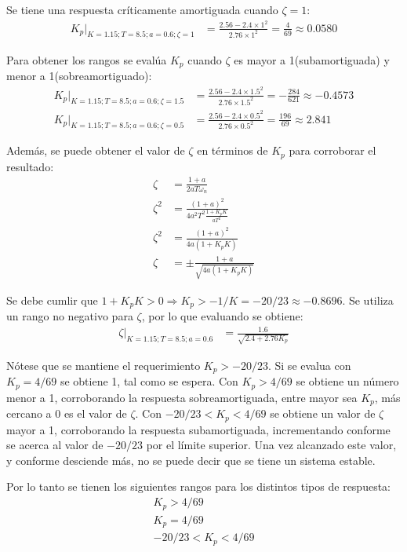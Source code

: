 \begin{ejercicio}
  Se tiene una respuesta críticamente amortiguada cuando $\zeta = 1$:
  \begin{align*}
    K_p|_{K=1.15; T=8.5; a=0.6; \zeta=1} &= \frac{2.56 - 2.4 \times 1^2 }{2.76 \times 1^2 } = \frac{4}{69} \approx 0.0580
  \end{align*}

  Para obtener los rangos se evalúa $K_p$ cuando $\zeta$ es mayor a 1(subamortiguada) y menor a 1(sobreamortiguado):
  \begin{align*}
    K_p|_{K=1.15; T=8.5; a=0.6; \zeta=1.5} &= \frac{2.56 - 2.4 \times 1.5^2 }{2.76 \times 1.5^2 } = -\frac{284}{621} \approx -0.4573
    \\
    K_p|_{K=1.15; T=8.5; a=0.6; \zeta=0.5} &= \frac{2.56 - 2.4 \times 0.5^2 }{2.76 \times 0.5^2 } = \frac{196}{69} \approx 2.841
  \end{align*}

  Además, se puede obtener el valor de $\zeta$ en términos de $K_p$ para corroborar el resultado:
  \begin{align*}
    \zeta &= \frac{1+a}{2aT\omega_n}
    \\
    \zeta^2 &= \frac{(1+a)^2}{4 a^2 T^2 \frac{1 + K_p K}{aT^2}}
    \\
    \zeta^2 &= \frac{(1+a)^2}{4 a (1 + K_p K)}
    \\
    \zeta &= \pm\frac{1+a}{\sqrt{4 a (1 + K_p K)}}
  \end{align*}

  Se debe cumlir que $1+K_p K > 0 \Rightarrow K_p > -1/K = -20/23 \approx -0.8696$.
  Se utiliza un rango no negativo para $\zeta$, por lo que evaluando se obtiene:
    \begin{align*}
    \zeta|_{K=1.15; T=8.5; a=0.6} &= \frac{1.6}{\sqrt{2.4 + 2.76 K_p}}
  \end{align*}

  Nótese que se mantiene el requerimiento $K_p > -20/23$. Si se evalua con $K_p = 4/69$ se obtiene 1, tal como se espera. Con $K_p>4/69$ se obtiene un número menor a 1, corroborando la respuesta sobreamortiguada, entre mayor sea $K_p$, más cercano a 0 es el valor de $\zeta$. Con $-20/23<K_p<4/69$ se obtiene un valor de $\zeta$ mayor a 1, corroborando la respuesta subamortiguada, incrementando conforme se acerca al valor de $-20/23$ por el límite superior. Una vez alcanzado este valor, y conforme desciende más, no se puede decir que se tiene un sistema estable.

  Por lo tanto se tienen los siguientes rangos para los distintos tipos de respuesta:
  \begin{align*}
    \tag{sobreamortiguada}
    K_p > 4/69
    \\
    \tag{críticamente amortiguada}
    K_p = 4/69
    \\
    \tag{subamortiguada}
    -20/23 < K_p < 4/69
    \\
  \end{align*}


\end{ejercicio}
